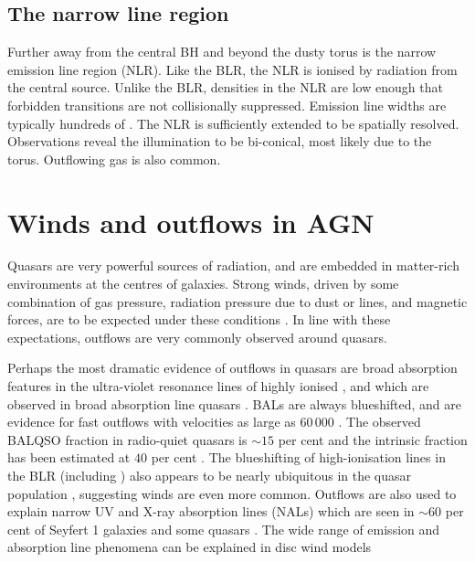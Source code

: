 \subsection{The narrow line region}

Further away from the central BH and beyond the dusty torus is the narrow emission line region (NLR). 
Like the BLR, the NLR is ionised by radiation from the central source. 
Unlike the BLR, densities in the NLR are low enough that forbidden transitions are not collisionally suppressed. 
Emission line widths are typically hundreds of \kms. 
The NLR is sufficiently extended to be spatially resolved. 
Observations reveal the illumination to be bi-conical, most likely due to the torus. 
Outflowing gas is also common.  

\section{Winds and outflows in AGN}

Quasars are very powerful sources of radiation, and are embedded in matter-rich environments at the centres of galaxies.
Strong winds, driven by some combination of gas pressure, radiation pressure due to dust or lines, and magnetic forces, are to be expected under these conditions \citep[e.g.][]{blandford82b,proga00,everett05}. 
In line with these expectations, outflows are very commonly observed around quasars. 

Perhaps the most dramatic evidence of outflows in quasars are broad absorption features in the ultra-violet resonance lines of highly ionised ,  and  which are observed in broad absorption line quasars \citep[BALQSOs;][]{weymann91}. 
BALs are always blueshifted, and are evidence for fast outflows with velocities as large as 60\,000 \kms \citep[e.g.][]{turnshek88}. 
The observed  BALQSO fraction in radio-quiet quasars is $\sim15$ per cent \citep[e.g.][]{hewett03,reichard03} and the intrinsic fraction has been estimated at $40$ per cent \citep{allen11}.
The blueshifting of high-ionisation lines in the BLR (including ) also appears to be nearly ubiquitous in the quasar population \citep[e.g.][]{richards02,richards11}, suggesting winds are even more common.
Outflows are also used to explain narrow UV and X-ray absorption lines (NALs) which are seen in $\sim60$ per cent of Seyfert 1 galaxies \citep{crenshaw99} and some quasars \citep[e.g.][]{hamann97}. 
The wide range of emission and absorption line phenomena can be explained in disc wind models \citep[e.g.][]{murray95,elvis00,proga00,everett05}

